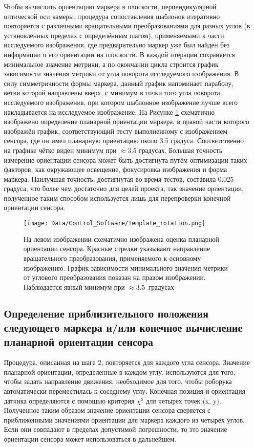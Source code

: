 Чтобы вычислить ориентацию маркера в плоскости, перпендикулярной оптической оси камеры, процедура сопоставления шаблонов итеративно повторяется с различными вращательными преобразованиями для разных углов (в установленных пределах с определённым шагом), применяемыми к части исследуемого изображения, где предварительно маркер уже был найден без информации о его ориентации на плоскости. В каждой итерации сохраняется минимальное значение метрики, а по окончании цикла строится график зависимости значения метрики от угла поворота исследуемого изображения. В силу симметричности формы маркера, данный график напоминает параболу, ветви которой направлены вверх, с минимум в точки того угла поворота исследуемого изображения, при котором шаблонное изображение лучше всего накладывается на исследуемое изображение. На Рисунке \ref{fig:template_rotation} схематично изображено определение планарной ориентации маркера, в правой части которого изображён график, соответствующий тесту выполненному с изображением сенсора, где он имел планарную ориентацию около 3.5 градуса. Соответственно на графике чётко виден минимум при $\approx$3.5 градусах. Большая точность измерение ориентации сенсора может быть достигнута путём оптимизации таких факторов, как окружающее освещение, фокусировка изображения и форма маркера. Наилучшая точность, достигнутая во время тестов, составила 0.025 градуса, что более чем достаточно для целей проекта, так значение ориентации, полученное таким способом используется лишь для перепроверки конечной ориентации сенсора.

\begin{figure}[ht]\centering
\texttt{[image: Data/Control\_Software/Template\_rotation.png]}
\caption{На левом изображении схематично изображена оценка планарной ориентации сенсора. Красные стрелки указывают направление вращательного преобразования, применяемого к основному изображению. График зависимости минимального значения метрики от углового преобразования показан на правом изображении. Наблюдается явный минимум при $\approx$3.5~градусах}
\label{fig:template_rotation}
\end{figure}

\subsection{Определение приблизительного положения следующего маркера и/или конечное вычисление планарной ориентации сенсора}

Процедура, описанная на шаге 2, повторяется для каждого угла сенсора. Значение планарной ориентации, определенные в каждом углу, используются для того, чтобы задать направление движения, необходимое для того, чтобы роборука автоматически переместилась к соседнему углу. Конечная позиция и ориентация датчика определяются с помощью критерия $\chi^{2}$ для четырех точек (x, y). Полученное таким образом значение ориентации сенсора сверяется с приближёнными значениями ориентации для маркера каждого из четырёх углов. Если они совпадают в пределах допустимой погрешности, то это значение ориентации сенсора может использоваться в дальнейшем.

